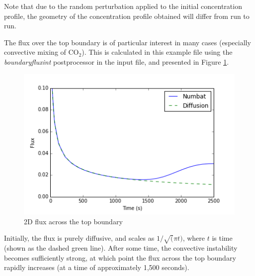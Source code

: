  Note that due to the random perturbation applied to the initial
concentration profile, the geometry of the concentration profile
obtained will differ from run to run.

The flux over the top boundary is of particular interest in many cases
(especially convective mixing of \(\textrm{CO}_2\)). This is calculated
in this example file using the \emph{boundaryfluxint} postprocessor in
the input file, and presented in Figure \ref{fig:2Dflux}.

\begin{figure}[htbp]
\centering
\includegraphics{images/2Dflux.png}
\caption{2D flux across the top boundary\label{fig:2Dflux}}
\end{figure}

 Initially, the flux is purely diffusive, and scales as
\(1 / \sqrt(\pi t)\), where \(t\) is time (shown as the dashed green
line). After some time, the convective instability becomes sufficiently
strong, at which point the flux across the top boundary rapidly
increases (at a time of approximately 1,500 seconds).
